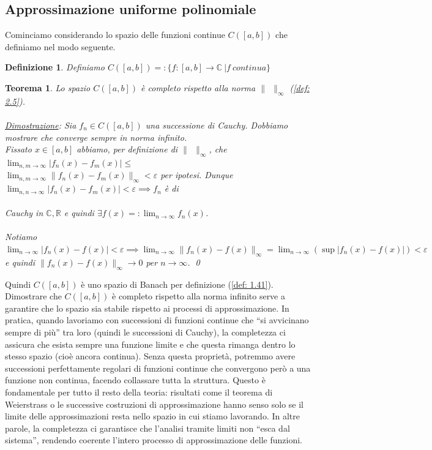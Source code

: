 \documentclass[a4paper,12pt]{report}
\newtheorem{teorema}{Teorema}[chapter]
\newtheorem{definizione}{Definizione}[chapter]
\newcommand{\lt}{<}
\begin{document}
\subsection{Approssimazione uniforme polinomiale}

 Cominciamo considerando lo spazio delle funzioni continue $C([a,b])$ che definiamo nel modo seguente.

\begin{definizione}
    Definiamo $C([a,b])=:\{f:[a,b]\to \mathbb{C} \ |f \ continua \}$
\end{definizione}

\begin{teorema}
    Lo spazio $C([a,b])$ è completo rispetto alla norma $\| \ \ \|_\infty$ (\ref{def: 2.5}).
    \\
    \\\underline{Dimostrazione}: Sia $f_n \in C([a,b])$ una successione di Cauchy. Dobbiamo mostrare che converge sempre in norma infinito.
    \\ Fissato $x \in [a,b]$ abbiamo, per definizione di $\| \ \ \|_\infty$, che $\displaystyle\lim_{n,m\to\infty}|f_n(x)-f_m(x)|\leq $ 
    \\$\lim_{n,m\to\infty}\|f_n(x)-f_m(x)\|_\infty \lt \varepsilon$ per ipotesi. Dunque $\displaystyle\lim_{n,n\to \infty}|f_n(x)-f_m(x)|\lt \varepsilon\implies f_n$ è di \\
    \\Cauchy in $\mathbb{C,R}$ e quindi $\exists f(x)=:\displaystyle\lim_{n\to\infty}f_n(x)$. 
    \\
    \\ Notiamo \mbox{$\displaystyle\lim_{n\to\infty}|f_n(x)-f(x)|\lt\varepsilon \implies \lim_{n\to\infty}\|f_n(x)-f(x)\|_\infty=\lim_{n\to\infty}(\sup |f_n(x)-f(x)|)\lt\varepsilon$} e quindi $\|f_n(x)-f(x)\|_\infty \to 0$ per $n\to \infty$. \qed
\end{teorema}

Quindi $C([a,b])$ è uno spazio di Banach per definizione (\ref{def: 1.41}). Dimostrare che $C([a,b])$ è completo rispetto alla norma infinito serve a garantire che lo spazio sia stabile rispetto ai processi di approssimazione.
In pratica, quando lavoriamo con successioni di funzioni continue che “si avvicinano sempre di più” tra loro (quindi le successioni di Cauchy), la completezza ci assicura che esista sempre una funzione limite e che questa rimanga dentro lo stesso spazio (cioè ancora continua). Senza questa proprietà, potremmo avere successioni perfettamente regolari di funzioni continue che convergono però a una funzione non continua, facendo collassare tutta la struttura.
Questo è fondamentale per tutto il resto della teoria: risultati come il teorema di Weierstrass o le successive costruzioni di approssimazione hanno senso solo se il limite delle approssimazioni resta nello spazio in cui stiamo lavorando. In altre parole, la completezza ci garantisce che l’analisi tramite limiti non “esca dal sistema”, rendendo coerente l’intero processo di approssimazione delle funzioni.
\end{document}
